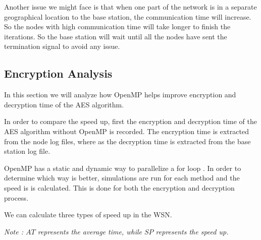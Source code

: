 \documentclass[conference]{IEEEtran}
\begin{document}
	Another issue we might face is that when one part of the network is in a separate geographical location to the base station, the communication time will increase. So the nodes with high communication time will take longer to finish the iterations. So the base station will wait until all the nodes have sent the termination signal to avoid any issue. 

	\subsection{Encryption Analysis}	\label{encry}
	
	In this section we will analyze how OpenMP helps improve encryption and decryption time of the AES algorithm.
	
	In order to compare the speed up, first the encryption and decryption time of the AES algorithm without OpenMP is recorded. The encryption time is extracted from the node log files, where as the decryption time is extracted from the base station log file. 
	
	OpenMP has a static and dynamic way to parallelize a for loop \cite{jakas_corner_2016}. In order to determine which way is better, simulations are run for each method and the speed is is calculated. This is done for both the encryption and decryption process. 
	
	We can calculate three types of speed up in the WSN. 
	
	\textit{Note : $AT$ represents the average time, while $SP$ represents the speed up.}
	
\end{document}
